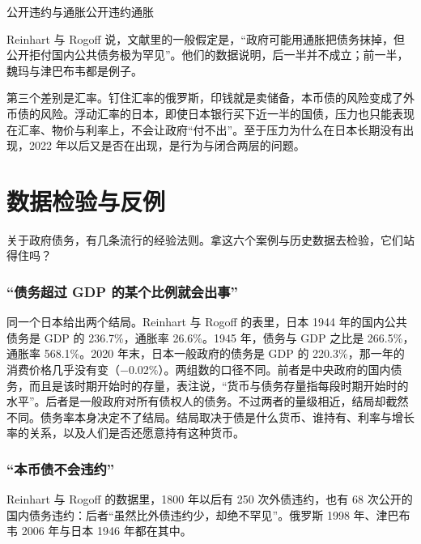 \begin{compare}{公开违约与通胀}{公开违约}{通胀}
\end{compare}

Reinhart 与 Rogoff 说，文献里的一般假定是，“政府可能用通胀把债务抹掉，但公开拒付国内公共债务极为罕见”\cite{reinhart2008}。他们的数据说明，后一半并不成立；前一半，魏玛与津巴布韦都是例子。

第三个差别是汇率。钉住汇率的俄罗斯，印钱就是卖储备，本币债的风险变成了外币债的风险。浮动汇率的日本，即使日本银行买下近一半的国债，压力也只能表现在汇率、物价与利率上，不会让政府“付不出”。至于压力为什么在日本长期没有出现，2022 年以后又是否在出现，是行为与闭合两层的问题。

\section{数据检验与反例}\label{sec:intro-test}

关于政府债务，有几条流行的经验法则。拿这六个案例与历史数据去检验，它们站得住吗？

\subsubsection{“债务超过 GDP 的某个比例就会出事”}
同一个日本给出两个结局。Reinhart 与 Rogoff 的表里，日本 1944 年的国内公共债务是 GDP 的 236.7\%，通胀率 26.6\%。1945 年，债务与 GDP 之比是 266.5\%，通胀率 568.1\%\cite{reinhart2008}。2020 年末，日本一般政府的债务是 GDP 的 220.3\%\cite{bis2026}，那一年的消费价格几乎没有变（$-0.02\%$）\cite{wdi2026}。两组数的口径不同。前者是中央政府的国内债务，而且是该时期开始时的存量，表注说，“货币与债务存量指每段时期开始时的水平”。后者是一般政府对所有债权人的债务。不过两者的量级相近，结局却截然不同。债务率本身决定不了结局。结局取决于债是什么货币、谁持有、利率与增长率的关系，以及人们是否还愿意持有这种货币。

\subsubsection{“本币债不会违约”}
Reinhart 与 Rogoff 的数据里，1800 年以后有 250 次外债违约，也有 68 次公开的国内债务违约：后者“虽然比外债违约少，却绝不罕见”\cite{reinhart2008}。俄罗斯 1998 年、津巴布韦 2006 年与日本 1946 年都在其中。

